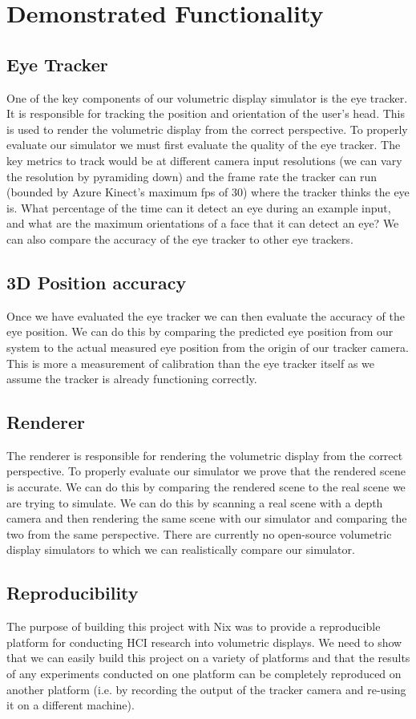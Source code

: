 \section{Demonstrated Functionality}
\subsection{Eye Tracker}
One of the key components of our volumetric display simulator is the eye tracker. It is responsible for tracking the position and orientation of the user's head. This is used to render the volumetric display from the correct perspective. To properly evaluate our simulator we must first evaluate the quality of the eye tracker. The key metrics to track would be at different camera input resolutions (we can vary the resolution by pyramiding down) and the frame rate the tracker can run (bounded by Azure Kinect's maximum fps of 30) where the tracker thinks the eye is. What percentage of the time can it detect an eye during an example input, and what are the maximum orientations of a face that it can detect an eye? We can also compare the accuracy of the eye tracker to other eye trackers.

\subsection{3D Position accuracy}
Once we have evaluated the eye tracker we can then evaluate the accuracy of the eye position. We can do this by comparing the predicted eye position from our system to the actual measured eye position from the origin of our tracker camera. This is more a measurement of calibration than the eye tracker itself as we assume the tracker is already functioning correctly.

\subsection{Renderer}
The renderer is responsible for rendering the volumetric display from the correct perspective. To properly evaluate our simulator we prove that the rendered scene is accurate. We can do this by comparing the rendered scene to the real scene we are trying to simulate. We can do this by scanning a real scene with a depth camera and then rendering the same scene with our simulator and comparing the two from the same perspective. There are currently no open-source volumetric display simulators to which we can realistically compare our simulator.

\subsection{Reproducibility}
The purpose of building this project with Nix was to provide a reproducible platform for conducting HCI research into volumetric displays. We need to show that we can easily build this project on a variety of platforms and that the results of any experiments conducted on one platform can be completely reproduced on another platform (i.e. by recording the output of the tracker camera and re-using it on a different machine). 

